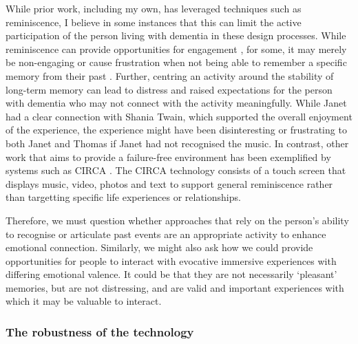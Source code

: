 While prior work, including my own, has leveraged techniques such as reminiscence, I believe in some instances that this can limit the active participation of the person living with dementia in these design processes. While reminiscence can provide opportunities for engagement \citep{gowans_designing_2004, yasuda_effectiveness_2009}, for some, it may merely be non-engaging or cause frustration when not being able to remember a specific memory from their past \citep{lazar_using_2014}. Further, centring an activity around the stability of long-term memory can lead to distress and raised expectations for the person with dementia who may not connect with the activity meaningfully. While Janet had a clear connection with Shania Twain, which supported the overall enjoyment of the experience, the experience might have been disinteresting or frustrating to both Janet and Thomas if Janet had not recognised the music. In contrast, other work that aims to provide a failure-free environment has been exemplified by systems such as CIRCA \citep{alm_communication_2007}. The CIRCA technology consists of a touch screen that displays music, video, photos and text to support general reminiscence rather than targetting specific life experiences or relationships.

Therefore, we must question whether approaches that rely on the person’s ability to recognise or articulate past events are an appropriate activity to enhance emotional connection. Similarly, we might also ask how we could provide opportunities for people to interact with evocative immersive experiences with differing emotional valence. It could be that they are not necessarily ‘pleasant’ memories, but are not distressing, and are valid and important experiences with which it may be valuable to interact.

\subsubsection{The robustness of the technology}
\label{S1:Robustness}





